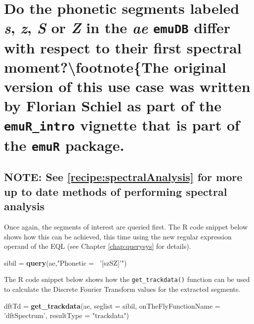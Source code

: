 \documentclass[]{book}
\newenvironment{Shaded}{\begin{snugshade}}{\end{snugshade}}
\newcommand{\DataTypeTok}[1]{\textcolor[rgb]{0.13,0.29,0.53}{#1}}
\newcommand{\KeywordTok}[1]{\textcolor[rgb]{0.13,0.29,0.53}{\textbf{#1}}}
\newcommand{\NormalTok}[1]{#1}
\newcommand{\StringTok}[1]{\textcolor[rgb]{0.31,0.60,0.02}{#1}}
\begin{document}
\hypertarget{sec:app-chap-useCases-q4}{%
\section{\texorpdfstring{Do the phonetic segments labeled \emph{s}, \emph{z}, \emph{S} or \emph{Z} in the \emph{ae} \texttt{emuDB} differ with respect to their first spectral moment?\protect\textbackslash{}footnote\{The original version of this use case was written by Florian Schiel as part of the \texttt{emuR\_intro} vignette that is part of the \texttt{emuR} package.}{Do the phonetic segments labeled s, z, S or Z in the ae emuDB differ with respect to their first spectral moment?\textbackslash{}footnote\{The original version of this use case was written by Florian Schiel as part of the emuR\_intro vignette that is part of the emuR package.}}\label{sec:app-chap-useCases-q4}}

\hypertarget{note-see-refrecipespectralanalysis-for-more-up-to-date-methods-of-performing-spectral-analysis}{%
\subsection{NOTE: See \ref{recipe:spectralAnalysis} for more up to date methods of performing spectral analysis}\label{note-see-refrecipespectralanalysis-for-more-up-to-date-methods-of-performing-spectral-analysis}}

Once again, the segments of interest are queried first. The R code snippet below shows how this can be achieved, this time using the new regular expression operand of the EQL (see Chapter \ref{chap:querysys} for details).

\begin{Shaded}
\begin{Highlighting}[]
\NormalTok{sibil =}\StringTok{ }\KeywordTok{query}\NormalTok{(ae,}\StringTok{"Phonetic =~ '[szSZ]'"}\NormalTok{)}
\end{Highlighting}
\end{Shaded}

The R code snippet below shows how the \texttt{get\_trackdata()} function can be used to calculate the Discrete Fourier Transform values for the extracted segments.

\begin{Shaded}
\begin{Highlighting}[]
\NormalTok{dftTd =}\StringTok{ }\KeywordTok{get_trackdata}\NormalTok{(ae,}
                      \DataTypeTok{seglist =}\NormalTok{ sibil,}
                      \DataTypeTok{onTheFlyFunctionName =} \StringTok{'dftSpectrum'}\NormalTok{,}
                      \DataTypeTok{resultType =} \StringTok{"trackdata"}\NormalTok{)}
\end{Highlighting}
\end{Shaded}
\end{document}
